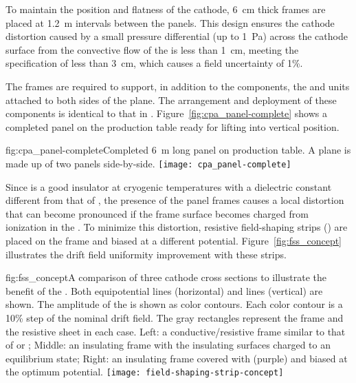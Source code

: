 To maintain the position and flatness of the cathode, 
\SI{6}{cm} thick \frfour frames are placed at \SI{1.2}{m} intervals between the  panels. This design ensures the cathode distortion caused by a small pressure differential (up to \SI{1}{Pa}) across the cathode surface from the convective flow of the  is less than \SI{1}{cm}, meeting the specification of less than \SI{3}{cm}, which causes a field uncertainty of 1\%.

The  frames are required to support, in addition to the  components, the  and  units attached to both sides of the  plane. The arrangement and deployment of these components is identical to that in .  Figure~\ref{fig:cpa_panel-complete} shows a completed   panel on the production table ready for lifting into vertical position. %

\begin{dunefigure}{fig:cpa_panel-complete}{Completed \SI{6}{m} long    panel on production table.  A  plane is made up of two panels side-by-side.}
\texttt{[image: cpa\_panel-complete]}
\end{dunefigure}

 Since \frfour is a good insulator at cryogenic temperatures with a dielectric constant different from that of , the presence of the  panel frames causes a local \efield distortion that can become pronounced if the frame surface becomes charged 
from ionization in the .  To minimize this distortion, resistive field-shaping strips () are placed on the frame and biased at a different potential.  Figure~\ref{fig:fss_concept} illustrates the drift field uniformity improvement with these strips.

\begin{dunefigure}{fig:fss_concept}{A comparison of three cathode cross sections to illustrate the benefit of the . Both equipotential lines (horizontal) and \efield{} lines (vertical) are shown.  The amplitude of the \efield{} is shown as color contours. Each color contour is a 10\% step of the nominal drift field.  The gray rectangles represent the frame and the resistive sheet in each case. Left: a conductive/resistive frame similar to that of  or ; Middle: an insulating frame with the insulating surfaces charged to an equilibrium state; Right: an insulating frame covered with  (purple) and biased at the optimum potential. }
\texttt{[image: field-shaping-strip-concept]} %
\end{dunefigure}

